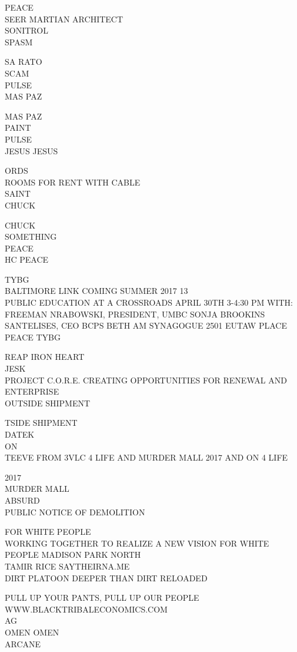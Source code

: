 \documentclass[10pt,letterpaper]{article}
\begin{document}
PEACE\\
SEER MARTIAN ARCHITECT\\
SONITROL\\
SPASM

SA RATO\\
SCAM\\
PULSE\\
MAS PAZ

MAS PAZ\\
PAINT\\
PULSE\\
JESUS JESUS

ORDS\\
ROOMS FOR RENT WITH CABLE\\
SAINT\\
CHUCK

CHUCK\\
SOMETHING\\
PEACE\\
HC PEACE

TYBG\\
BALTIMORE LINK COMING SUMMER 2017 13\\
PUBLIC EDUCATION AT A CROSSROADS APRIL 30TH 3{-}4:30 PM WITH: FREEMAN NRABOWSKI, PRESIDENT, UMBC SONJA BROOKINS SANTELISES, CEO BCPS BETH AM SYNAGOGUE 2501 EUTAW PLACE\\
PEACE TYBG

REAP IRON HEART\\
JESK\\
PROJECT C.O.R.E. CREATING OPPORTUNITIES FOR RENEWAL AND ENTERPRISE\\
OUTSIDE SHIPMENT

TSIDE SHIPMENT\\
DATEK\\
ON\\
TEEVE FROM 3VLC 4 LIFE AND MURDER MALL 2017 AND ON 4 LIFE

2017\\
MURDER MALL\\
ABSURD\\
PUBLIC NOTICE OF DEMOLITION

FOR WHITE PEOPLE\\
WORKING TOGETHER TO REALIZE A NEW VISION FOR WHITE PEOPLE MADISON PARK NORTH\\
TAMIR RICE SAYTHEIRNA.ME\\
DIRT PLATOON DEEPER THAN DIRT RELOADED

PULL UP YOUR PANTS, PULL UP OUR PEOPLE WWW.BLACKTRIBALECONOMICS.COM\\
AG\\
OMEN OMEN\\
ARCANE
\end{document}
